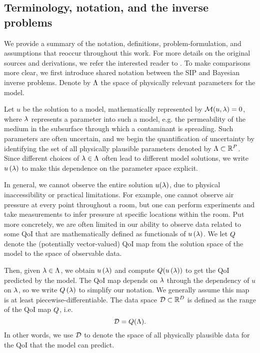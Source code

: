 \subsection{Terminology, notation, and the inverse problems}
We provide a summary of the notation, definitions, problem-formulation, and assumptions that reoccur throughout this work.
For more details on the original sources and derivations,  we refer the interested reader to \cite{BES12, BE13, BET+14, BJW18, BWY21}.
To make comparisons more clear, we first introduce shared notation between the SIP and Bayesian inverse problems.
Denote by ${\Lambda}$ the space of physically relevant parameters for the model.

Let $u$ be the solution to a model, mathematically represented by $\mathcal{M}(u, \lambda) = 0$, where $\lambda$ represents a parameter into such a model, e.g. the permeability of the medium in the subsurface through which a contaminant is spreading.
Such parameters are often uncertain, and we begin the quantification of uncertainty by identifying the set of all physically plausible parameters denoted by ${\Lambda}\subset\mathbb{R}^P$.
Since different choices of $\lambda \in {\Lambda}$ often lead to different model solutions, we write $u\left ( \lambda \right )$ to make this dependence on the parameter space explicit.

In general, we cannot observe the entire solution $u(\lambda)$, due to physical inaccessibility or practical limitations.
For example, one cannot observe air pressure at every point throughout a room, but one can perform experiments and take measurements to infer pressure at specific locations within the room.
Put more concretely, we are often limited in our ability to observe data related to some QoI that are mathematically defined as functionals of $u\left ( \lambda \right )$.%
We let $Q$ denote the (potentially vector-valued) QoI map from the solution space of the model to the space of observable data.

Then, given $\lambda \in {\Lambda}$, we obtain $u\left ( \lambda \right )$ and compute $Q(u\left ( \lambda \right ))$ to get the QoI predicted by the model.
The QoI map depends on $\lambda$ through the dependency of $u$ on $\lambda$, so we write $Q\left ( \lambda \right )$ to simplify our notation.
We generally assume this map is at least piecewise-differentiable.
The data space $\mathcal{D} \subset \mathbb{R}^D$ is defined as the range of the QoI map $Q$, i.e.
\[
\mathcal{D} = Q({\Lambda}).
\]
In other words, we use $\mathcal{D}$ to denote the space of all physically plausible data for the QoI that the model can predict.


